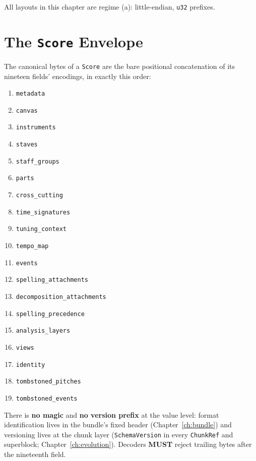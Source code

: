 \documentclass[11pt,letterpaper]{report}
\newcounter{requirement}[chapter]
\newcommand{\MUST}{\textbf{MUST}}
\begin{document}
All layouts in this chapter are regime (a): little-endian, \texttt{u32}
prefixes.

\section{The \texttt{Score} Envelope}
\label{sec:values:score}

\begin{requirement}
\label{req:binfmt:score-envelope}
The canonical bytes of a \texttt{Score} are the bare positional
concatenation of its nineteen fields' encodings, in exactly this order:

\begin{enumerate}
  \item \texttt{metadata}
  \item \texttt{canvas}
  \item \texttt{instruments}
  \item \texttt{staves}
  \item \texttt{staff\_groups}
  \item \texttt{parts}
  \item \texttt{cross\_cutting}
  \item \texttt{time\_signatures}
  \item \texttt{tuning\_context}
  \item \texttt{tempo\_map}
  \item \texttt{events}
  \item \texttt{spelling\_attachments}
  \item \texttt{decomposition\_attachments}
  \item \texttt{spelling\_precedence}
  \item \texttt{analysis\_layers}
  \item \texttt{views}
  \item \texttt{identity}
  \item \texttt{tombstoned\_pitches}
  \item \texttt{tombstoned\_events}
\end{enumerate}

There is \textbf{no magic} and \textbf{no version prefix} at the value
level: format identification lives in the bundle's fixed header
(Chapter~\ref{ch:bundle}) and versioning lives at the chunk layer
(\texttt{SchemaVersion} in every \texttt{ChunkRef} and superblock;
Chapter~\ref{ch:evolution}). Decoders \MUST{} reject trailing bytes after
the nineteenth field.
\end{requirement}
\end{document}
